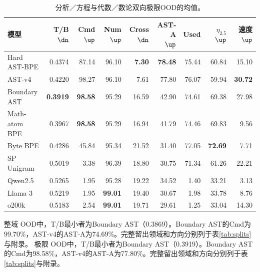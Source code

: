 \par\begin{table}[H]\centering\small
\caption{分析／方程与代数／数论双向极限OOD的均值。}\label{tab:extreme}
\begin{tabular}{lrrrrrrrr}\toprule
模型 & T/B $\dn$ & Cmd $\up$ & Num $\up$ & Cross $\dn$ & AST-A $\up$ & Used & $\eta_{2.5}$ $\up$ & 速度 $\up$ \\\midrule
Hard AST-BPE & 0.4374 & 87.14 & 96.10 & \textbf{7.30} & \textbf{78.48} & 75.44 & 60.84 & 15.10 \\
AST-v4 & 0.4220 & 98.27 & 96.10 & 7.61 & 77.80 & 76.07 & 59.94 & \textbf{30.72} \\
Boundary AST & \textbf{0.3919} & \textbf{98.58} & 95.29 & 16.59 & 42.90 & 74.61 & 69.38 & 27.98 \\
Math-atom BPE & 0.3967 & \textbf{98.58} & 95.29 & 16.94 & 41.79 & 74.46 & 69.83 & 9.56 \\
Byte BPE & 0.4286 & 45.84 & 95.34 & 21.52 & 31.40 & 77.05 & \textbf{72.69} & 7.71 \\
SP Unigram & 0.5019 & 3.38 & 96.39 & 18.80 & 30.75 & 71.34 & 61.26 & 22.21 \\
\midrule
Qwen2.5 & 0.5265 & 1.95 & 95.28 & 19.22 & 34.52 & 1.40 & 33.21 & 3.13 \\
Llama 3 & 0.5219 & 1.95 & \textbf{99.01} & 19.40 & 30.67 & 1.98 & 33.78 & 8.76 \\
o200k & 0.5183 & 2.54 & \textbf{99.01} & 19.71 & 29.61 & 1.25 & 33.04 & 14.30 \\
\bottomrule\end{tabular}
\end{table}\par

整域 OOD中，T/B最小者为Boundary AST（0.3869）。Boundary AST的Cmd为99.70\%，AST-v4的AST-A为74.69\%。完整留出领域和方向分别列于表\ref{tab:splits}与附录。
极限 OOD中，T/B最小者为Boundary AST（0.3919）。Boundary AST的Cmd为98.58\%，AST-v4的AST-A为77.80\%。完整留出领域和方向分别列于表\ref{tab:splits}与附录。

